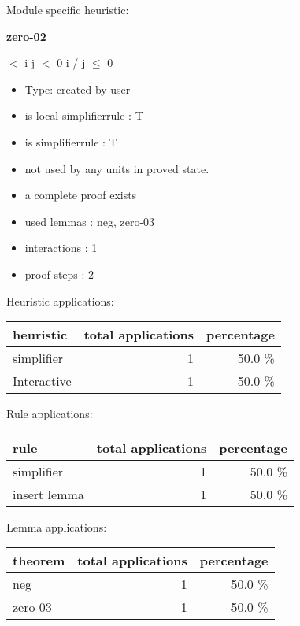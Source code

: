 \documentclass[a4paper]{article}
\begin{document}
Module specific heuristic:

\pagebreak

{\LARGE\bf zero-02}\label{lemma-zero-02}

\medskip

  $<$ i \And j $<$ 0 \Imp i / j $\le$ 0

\begin{itemize}

\item Type: created by user

\item is local simplifierrule : T
\item is simplifierrule : T
\item not used by any units in proved state.
\item       a complete proof exists
\item       used lemmas  : neg, zero-03
\item       interactions : 1
\item       proof steps  : 2
\end{itemize}

\medskip


Heuristic applications:

\begin{supertabular}{l|r|r}
heuristic	& total applications & percentage \\ \hline
simplifier & 1 & 50.0 \% \\
Interactive & 1 & 50.0 \% \\

\end{supertabular}

Rule applications:

\begin{supertabular}{l|r|r}
rule	        & total applications & percentage \\ \hline
simplifier & 1 & 50.0 \% \\
insert lemma & 1 & 50.0 \% \\

\end{supertabular}

Lemma applications:

\begin{supertabular}{l|r|r}
theorem	        & total applications & percentage \\ \hline
neg & 1 & 50.0 \% \\
zero-03 & 1 & 50.0 \% \\

\end{supertabular}
\end{document}
